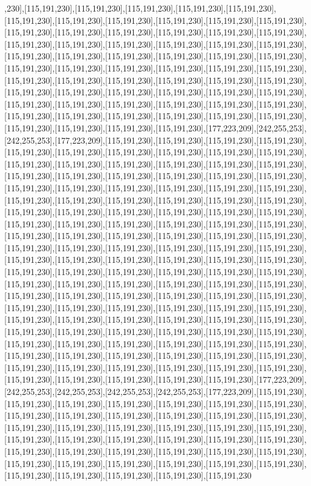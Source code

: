 ,230],[115,191,230],[115,191,230],[115,191,230],[115,191,230],[115,191,230],[115,191,230],[115,191,230],[115,191,230],[115,191,230],[115,191,230],[115,191,230],[115,191,230],[115,191,230],[115,191,230],[115,191,230],[115,191,230],[115,191,230],[115,191,230],[115,191,230],[115,191,230],[115,191,230],[115,191,230],[115,191,230],[115,191,230],[115,191,230],[115,191,230],[115,191,230],[115,191,230],[115,191,230],[115,191,230],[115,191,230],[115,191,230],[115,191,230],[115,191,230],[115,191,230],[115,191,230],[115,191,230],[115,191,230],[115,191,230],[115,191,230],[115,191,230],[115,191,230],[115,191,230],[115,191,230],[115,191,230],[115,191,230],[115,191,230],[115,191,230],[115,191,230],[115,191,230],[115,191,230],[115,191,230],[115,191,230],[115,191,230],[115,191,230],[115,191,230],[115,191,230],[115,191,230],[115,191,230],[115,191,230],[115,191,230],[115,191,230],[115,191,230],[177,223,209],[242,255,253],[242,255,253],[177,223,209],[115,191,230],[115,191,230],[115,191,230],[115,191,230],[115,191,230],[115,191,230],[115,191,230],[115,191,230],[115,191,230],[115,191,230],[115,191,230],[115,191,230],[115,191,230],[115,191,230],[115,191,230],[115,191,230],[115,191,230],[115,191,230],[115,191,230],[115,191,230],[115,191,230],[115,191,230],[115,191,230],[115,191,230],[115,191,230],[115,191,230],[115,191,230],[115,191,230],[115,191,230],[115,191,230],[115,191,230],[115,191,230],[115,191,230],[115,191,230],[115,191,230],[115,191,230],[115,191,230],[115,191,230],[115,191,230],[115,191,230],[115,191,230],[115,191,230],[115,191,230],[115,191,230],[115,191,230],[115,191,230],[115,191,230],[115,191,230],[115,191,230],[115,191,230],[115,191,230],[115,191,230],[115,191,230],[115,191,230],[115,191,230],[115,191,230],[115,191,230],[115,191,230],[115,191,230],[115,191,230],[115,191,230],[115,191,230],[115,191,230],[115,191,230],[115,191,230],[115,191,230],[115,191,230],[115,191,230],[115,191,230],[115,191,230],[115,191,230],[115,191,230],[115,191,230],[115,191,230],[115,191,230],[115,191,230],[115,191,230],[115,191,230],[115,191,230],[115,191,230],[115,191,230],[115,191,230],[115,191,230],[115,191,230],[115,191,230],[115,191,230],[115,191,230],[115,191,230],[115,191,230],[115,191,230],[115,191,230],[115,191,230],[115,191,230],[115,191,230],[115,191,230],[115,191,230],[115,191,230],[115,191,230],[115,191,230],[115,191,230],[115,191,230],[115,191,230],[115,191,230],[115,191,230],[115,191,230],[115,191,230],[115,191,230],[115,191,230],[115,191,230],[115,191,230],[115,191,230],[115,191,230],[115,191,230],[115,191,230],[115,191,230],[115,191,230],[115,191,230],[115,191,230],[115,191,230],[115,191,230],[115,191,230],[115,191,230],[115,191,230],[177,223,209],[242,255,253],[242,255,253],[242,255,253],[242,255,253],[177,223,209],[115,191,230],[115,191,230],[115,191,230],[115,191,230],[115,191,230],[115,191,230],[115,191,230],[115,191,230],[115,191,230],[115,191,230],[115,191,230],[115,191,230],[115,191,230],[115,191,230],[115,191,230],[115,191,230],[115,191,230],[115,191,230],[115,191,230],[115,191,230],[115,191,230],[115,191,230],[115,191,230],[115,191,230],[115,191,230],[115,191,230],[115,191,230],[115,191,230],[115,191,230],[115,191,230],[115,191,230],[115,191,230],[115,191,230],[115,191,230],[115,191,230],[115,191,230],[115,191,230],[115,191,230],[115,191,230],[115,191,230],[115,191,230],[115,191,230